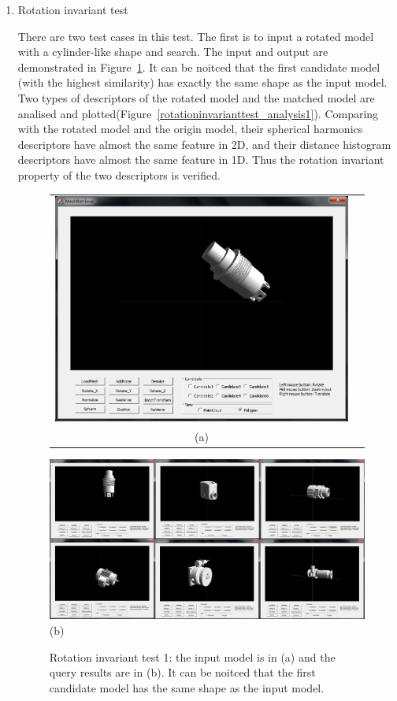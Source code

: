\begin{enumerate}
\item Rotation invariant test

There are two test cases in this test. The first is to input a rotated model with a cylinder-like shape and search. The input and output are demonstrated in Figure~\ref{noiseinvarianttest_UI1}.  It can be noitced that the first candidate model (with the highest similarity) has exactly the same shape as the input model. Two types of descriptors of the rotated model and the matched model are　analised and plotted(Figure~\ref{rotationinvarianttest_analysis1}). Comparing with the rotated model and the origin model, their spherical harmonics descriptors have almost the same feature in 2D, and their distance histogram descriptors have almost the same feature in 1D. Thus the rotation invariant property of the two descriptors is verified.

\begin{figure}
\begin{center}
\begin{tabular}{cc}   %
   \includegraphics[width=0.6\linewidth]{input_rotationinvariant_test10}  \\
   (a) \\
\end{tabular}
   \includegraphics[width=1\linewidth]{output_rotationinvariant_test10}  \\
   (b)  \\
\caption{Rotation invariant test 1: the input model is in (a) and the query results are in (b). It can be noitced that the first candidate model has the same shape as the input model.} 
  \label{noiseinvarianttest_UI1}
\end{center}
\end{figure}


\end{enumerate}
